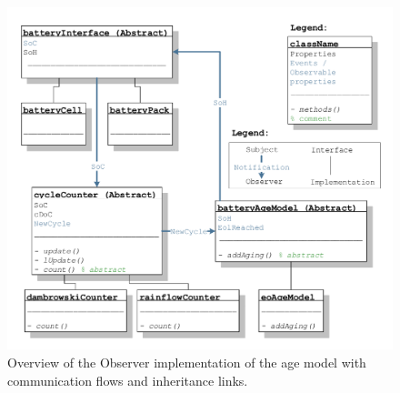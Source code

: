 \begin{figure}[t!]
	\captionsetup{type=figure}
	\centering
	\includegraphics[width=\textwidth]{observer_schema.pdf}
	\caption[Overview of the Observer implementation of the age model with communication flows and inheritance links]{Overview of the Observer implementation of the age model with communication flows and inheritance links.}
	\label{fig:observer_schema}
\end{figure}

